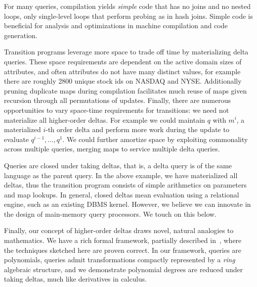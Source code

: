 For many queries, compilation yields \textit{simple} code that has no joins
and no nested loops, only single-level loops that perform probing as
in hash joins.
Simple code is beneficial for analysis and optimizations in machine
compilation and code generation.

Transition programs leverage more space to trade off time by materializing delta
queries. These space requirements are dependent on the active domain sizes of
attributes, and often attributes do not have many distinct values, for example
there are roughly 2800 unique stock ids on NASDAQ and NYSE. Additionally pruning
duplicate maps during compilation facilitates much reuse of maps given recursion
through all permutations of updates. Finally, there are numerous opportunities
to vary space-time requirements for transitions: we need not materialize all
higher-order deltas. For example we could maintain $q$ with $m^i$, a
materialized $i$-th order delta and perform more work during the update to
evaluate $q^{i-1}, \ldots, q^1$. We could further amortize space by exploiting
commonality across multiple queries, merging maps to service multiple delta
queries.



Queries are closed under taking deltas, that is, a delta query is of the same
language as the parent query. In the above example, we have materialized all
deltas, thus the transition program consists of simple arithmetics on parameters
and map lookups. In general, closed deltas mean evaluation using a relational
engine, such as an existing DBMS kernel. However, we believe we can innovate in
the design of main-memory query processors. We touch on this below.

Finally, our concept of higher-order deltas draws novel, natural analogies to
mathematics. We have a rich formal framework, partially described
in~\cite{koch-pods:10}, where the techniques sketched here are proven correct.
In our framework, queries are polynomials, queries admit transformations
compactly represented by a \textit{ring} algebraic structure, and we demonstrate
polynomial degrees are reduced under taking deltas, much like derivatives in
calculus.

